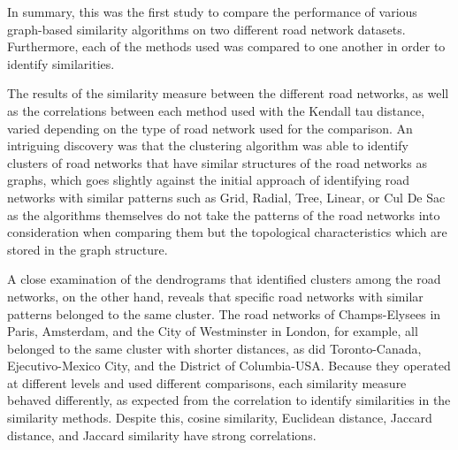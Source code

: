 
In summary, this was the first study to compare the performance of various graph-based similarity algorithms on two different road network datasets. Furthermore, each of the methods used was compared to one another in order to identify similarities.

The results of the similarity measure between the different road networks, as well as the correlations between each method used with the Kendall tau distance, varied depending on the type of road network used for the comparison. An intriguing discovery was that the clustering algorithm was able to identify clusters of road networks that have similar structures of the road networks as graphs, which goes slightly against the initial approach of identifying road networks with similar patterns such as Grid, Radial, Tree, Linear, or Cul De Sac as the algorithms themselves do not take the patterns of the road networks into consideration when comparing them but the topological characteristics which are stored in the graph structure.

A close examination of the dendrograms that identified clusters among the road networks, on the other hand, reveals that specific road networks with similar patterns belonged to the same cluster. The road networks of Champs-Elysees in Paris, Amsterdam, and the City of Westminster in London, for example, all belonged to the same cluster with shorter distances, as did Toronto-Canada, Ejecutivo-Mexico City, and the District of Columbia-USA. Because they operated at different levels and used different comparisons, each similarity measure behaved differently, as expected from the correlation to identify similarities in the similarity methods. Despite this, cosine similarity, Euclidean distance, Jaccard distance, and Jaccard similarity have strong correlations.


